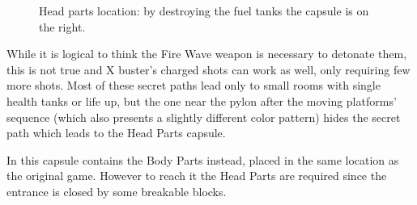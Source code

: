 \begin{figure}[htp]
\begin{subfigure}{0.4\linewidth}
 		\caption{}
 	\end{subfigure}
 	\caption{Head parts location: by destroying the fuel tanks the capsule is on the right.}
 \end{figure}While it is logical to think the Fire Wave weapon is necessary to detonate them, this is not true and X buster's charged shots can work as well, only requiring few more shots. Most of these secret paths lead only to small rooms with single health tanks or life up, but the one near the pylon after the moving platforms' sequence (which also presents a slightly different color pattern) hides the  secret path which leads to the Head Parts capsule. 

 In \mhx this capsule contains the Body Parts instead, placed in the same location as the original game. However to reach it the Head Parts are required since the entrance is closed by some breakable blocks.
 
